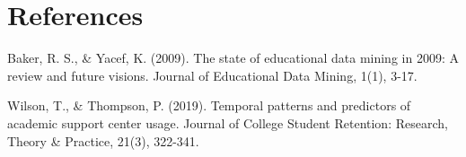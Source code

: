 \documentclass[12pt,letterpaper]{article}
\begin{document}
\section{References}

\begin{thebibliography}{9}

 Baker, R. S., \& Yacef, K. (2009). The state of educational data mining in 2009: A review and future visions. Journal of Educational Data Mining, 1(1), 3-17.

 Wilson, T., \& Thompson, P. (2019). Temporal patterns and predictors of academic support center usage. Journal of College Student Retention: Research, Theory \& Practice, 21(3), 322-341.

\end{thebibliography}
\end{document}
